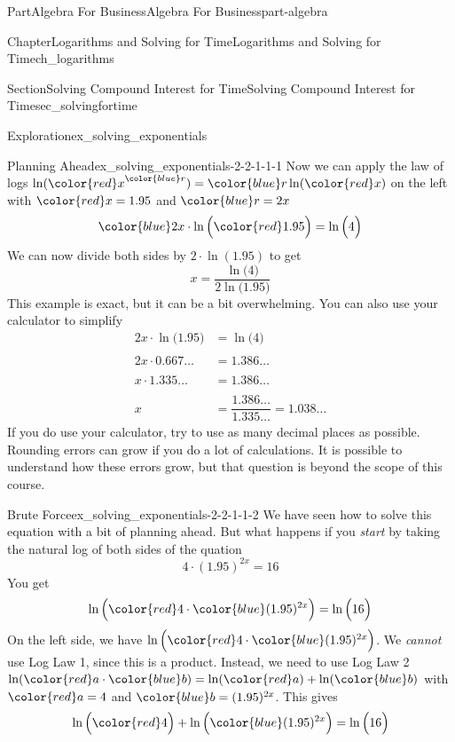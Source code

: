 \documentclass[oneside,10pt,]{tufte-book}
\numberwithin{equation}{chapter}
\newcommand{\amp}{&}
\begin{document}
\begin{partptx}{Part}{Algebra For Business}{}{Algebra For Business}{}{}{part-algebra}
\begin{chapterptx}{Chapter}{Logarithms and Solving for Time}{}{Logarithms and Solving for Time}{}{}{ch_logarithms}
\begin{sectionptx}{Section}{Solving Compound Interest for Time}{}{Solving Compound Interest for Time}{}{}{sec_solvingfortime}
\begin{exploration}{Exploration}{}{ex_solving_exponentials}
\begin{enumerate}[font=\bfseries,label=(\alph*),ref=\alph*]
\begin{descriptionlist}
\begin{dlimedium}{Planning Ahead}{ex_solving_exponentials-2-2-1-1-1}
Now we can apply the law of logs \(\ln({\color{red}x}^{\color{blue}r})= {\color{blue}r}\ln({\color{red}x})\) on the left with \(\color{red} x = 1.95\) and \(\color{blue} r = 2x\)%
\begin{equation*}
{\color{blue} 2x} \cdot \ln\Big({\color{red} 1.95}\Big) = \ln\Big(4\Big)
\end{equation*}
We can now divide both sides by \(2\cdot \ln(1.95)\) to get%
\begin{equation*}
x = \dfrac{\ln\Big(4\Big)}{2\ln\Big(1.95\Big)}
\end{equation*}
This example is exact, but it can be a bit overwhelming.  You can also use your calculator to simplify%
\begin{align*}
2x \cdot \ln\Big(1.95\Big) \amp = \ln\Big(4\Big) \\
\\
2x \cdot 0.667\dots \amp = 1.386\dots \\
\\
x\cdot 1.335\dots  \amp = 1.386\dots\\
\\
x \amp = \dfrac{1.386\dots}{1.335\dots} = 1.038\dots
\end{align*}
If you do use your calculator, try to use as many decimal places as possible.  Rounding errors can grow if you do a lot of calculations.  It is possible to understand how these errors grow, but that question is beyond the scope of this course.%
\end{dlimedium}%
\begin{dlimedium}{Brute Force}{ex_solving_exponentials-2-2-1-1-2}%
We have seen how to solve this equation with a bit of planning ahead.  But what happens if you \emph{start} by taking the natural log of both sides of the quation%
\begin{equation*}
4\cdot(1.95)^{2x} = 16
\end{equation*}
You get%
\begin{equation*}
\ln\Big( {\color{red} 4}\cdot{\color{blue} (1.95)^{2x}} \Big) = \ln\Big(16\Big)
\end{equation*}
On the left side, we have \(\ln\Big( {\color{red} 4}\cdot{\color{blue} (1.95)^{2x}} \Big)\).  We \emph{cannot} use Log Law 1, since this is a product.  Instead, we need to use Log Law 2 \(\ln({\color{red} a}\cdot {\color{blue} b}) = \ln({\color{red} a}) + \ln({\color{blue} b})\) with \(\color{red} a=4\) and \(\color{blue} b=(1.95)^{2x}\).  This gives%
\begin{equation*}
\ln\Big( {\color{red} 4}\Big) + \ln\Big({\color{blue} (1.95)^{2x}} \Big) = \ln\Big(16\Big)

\end{equation*}
\end{dlimedium}
\end{descriptionlist}
\end{enumerate}
\end{exploration}
\end{sectionptx}
\end{chapterptx}
\end{partptx}
\end{document}
